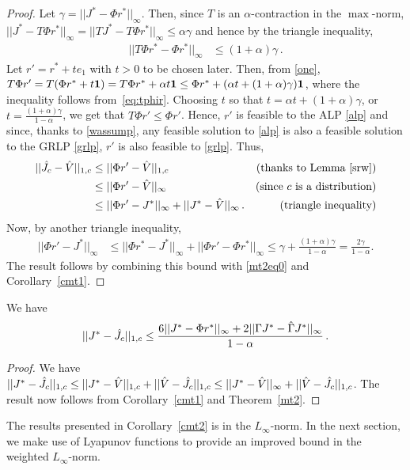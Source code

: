 \begin{proof}
Let $\gamma=||J^*-\Phi r^*||_\infty$. Then, since $T$ is an $\alpha$-contraction in the $\max$-norm,
$||J^*-T\Phi r^*||_\infty=||TJ^*-T\Phi r^*||_\infty\leq\alpha\gamma$ and hence by the triangle inequality,
\begin{align}\label{eq:tphir}
||T\Phi r^*-\Phi r^*||_\infty&\leq(1+\alpha)\gamma\,.
\end{align}
Let $r'= r^*+t e_1$ with $t>0$ to be chosen later.
Then, from \cref{one},
$T\Phi r' = T(\Phi r^* + t \mathbf{1}) = T \Phi r^* + \alpha t \mathbf{1} \le \Phi r^* + (\alpha t+ (1+\alpha) \gamma) \mathbf{1}$,
 where the inequality follows from~\eqref{eq:tphir}.
 Choosing $t$ so that $t = \alpha t+ (1+\alpha) \gamma$, or $t = \frac{(1+\alpha)\gamma}{1-\alpha}$, we get
 that $T\Phi r' \le \Phi r'$. Hence, $r'$ is feasible to the ALP \eqref{alp} and 
since, thanks to \cref{wassump}, 
any feasible solution to \eqref{alp} is also a feasible solution to the GRLP  \eqref{grlp},
$r'$ is also feasible to \eqref{grlp}. Thus, 
\begin{align}
||\hj-\hv||_{1,c}&\leq||\Phi r'-\hv||_{1,c}\nn &(\text{thanks to Lemma~\ref{srw}}) \\ %
&\leq||\Phi r'-\hv||_\infty\mb & (\text{since $c$ is a distribution})\nn\\
&\leq||\Phi r'-J^*||_\infty+||J^*-\hv||_\infty\,. & (\text{triangle inequality}) \label{mt2eq0}
\end{align}
Now, by another triangle inequality,
\begin{align}
||\Phi r'-J^*||_\infty&\leq ||\Phi r^* -J^*||_\infty+||\Phi r'-\Phi r^*||_\infty
\leq \gamma+\frac{(1+\alpha)\gamma}{1-\alpha}=\frac{2\gamma}{1-\alpha}.
\label{mt2eq1}
\end{align}
The result follows by combining this bound with \eqref{mt2eq0} and Corollary~\ref{cmt1}.
\end{proof}

\begin{corollary}
\label{cmt2}
We have
\begin{align}\label{finalbnd}
||J^*-\hj||_{1,c}\leq\frac{6 ||J^*-\Phi r^*||_\infty+2||\Gamma J^*-\hg J^*||_\infty}{1-\alpha}\,.
\end{align}
\end{corollary}
\begin{proof}
We have
$
||J^*-\hat{J}_c||_{1,c}\leq||J^*-\hat{V}||_{1,c}+||\hat{V}-\hat{J}_c||_{1,c}
\leq||J^*-\hat{V}||_\infty+||\hat{V}-\hat{J}_c||_{1,c}
$.
The result now follows from Corollary~\ref{cmt1} and Theorem~\ref{mt2}.
\end{proof}
The results presented in Corollary~\ref{cmt2} is in the $L_\infty$-norm. In the next section, we make use of Lyapunov functions to provide an improved bound in the weighted $L_\infty$-norm.
